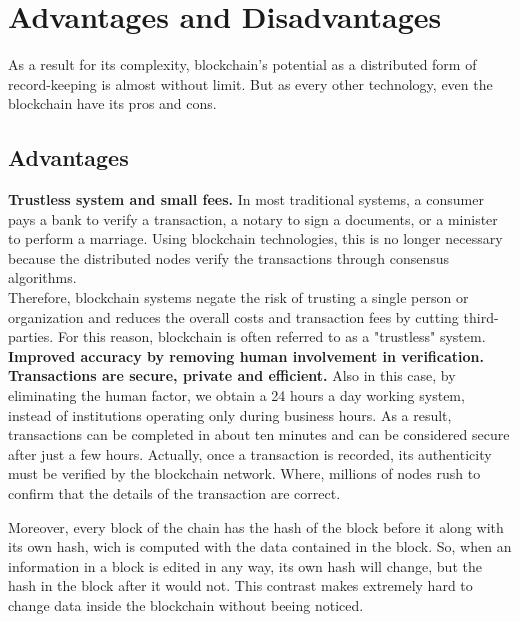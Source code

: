 \section{Advantages and Disadvantages}
\label{sec:evaluate}

As a result for its complexity, blockchain's potential as a distributed 
form of record-keeping is almost without limit. But as every other 
technology, even the blockchain have its pros and cons. 

\subsection{Advantages}
\label{sec:advantages}

\textbf{Trustless system and small fees.}
In most traditional systems, a consumer pays a bank to verify a transaction,   
a notary to sign a documents, or a minister to perform a marriage. Using 
blockchain technologies, this is no longer necessary because the distributed
nodes verify the transactions through consensus algorithms.\\
Therefore, blockchain systems negate the risk of trusting a single person or 
organization and reduces the overall costs and transaction fees by cutting 
third-parties. For this reason, blockchain is often referred to as a "trustless"
system.\cite{binancevision}\cite{investopedia}
\bigskip\\
\textbf{Improved accuracy by removing human involvement in verification.} 
\bigskip\\
\textbf{Transactions are secure, private and efficient.}
Also in this case, by eliminating the human factor, we obtain a 24 hours a day 
working system, instead of institutions operating only during business hours.
As a result, transactions can be completed in about ten minutes and can be 
considered secure after just a few hours. Actually, once a transaction is 
recorded, its authenticity must be verified by the blockchain network. Where, 
millions of nodes rush to confirm that the details of the transaction are correct.

Moreover, every block of the chain has the hash of the block before it along with
its own hash, wich is computed with the data contained in the block. So, when
an information in a block is edited in any way, its own hash will change, but the
hash in the block after it would not. This contrast makes extremely hard to 
change data inside the blockchain without beeing noticed.


